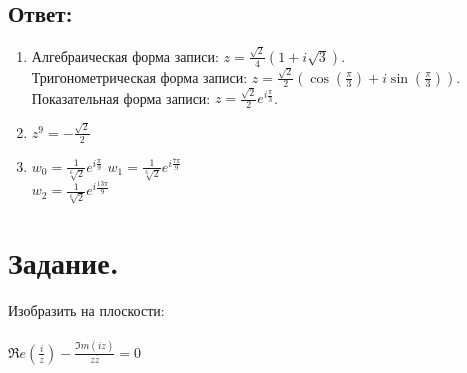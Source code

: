 \documentclass[12pt, a4paper]{article}
\begin{document}
    \subsection*{Ответ:}
    \begin{enumerate}
        \item [а)] 
        Алгебраическая форма записи: 
        $z = \frac{\sqrt{2}}{4}(1 + i\sqrt{3})$.\\
        Тригонометрическая форма записи: 
        $z = \frac{\sqrt{2}}{2}(\cos(\frac{\pi}{3}) + i\sin(\frac{\pi}{3}))$.\newline
        Показательная форма записи:
        $z = \frac{\sqrt{2}}{2}e^{i\frac{\pi}{3}}$.\\
        \item [б)] $z^9 = -\frac{\sqrt{2}}{2}$
        \item [в)] $w_0 = \frac{1}{\sqrt[6]{2}}e^{i\frac{\pi}{9}}$\newline
        $w_1 = \frac{1}{\sqrt[6]{2}}e^{i\frac{7\pi}{9}}$\\
        $w_2 = \frac{1}{\sqrt[6]{2}}e^{i\frac{13\pi}{9}}$\\
    \end{enumerate}
%
%
\section{Задание.}
    Изобразить на плоскости:\\\\
    $\Re e(\frac{i}{z}) - \frac{\Im m(iz)}{z\overline{z}} = 0$
\end{document}
